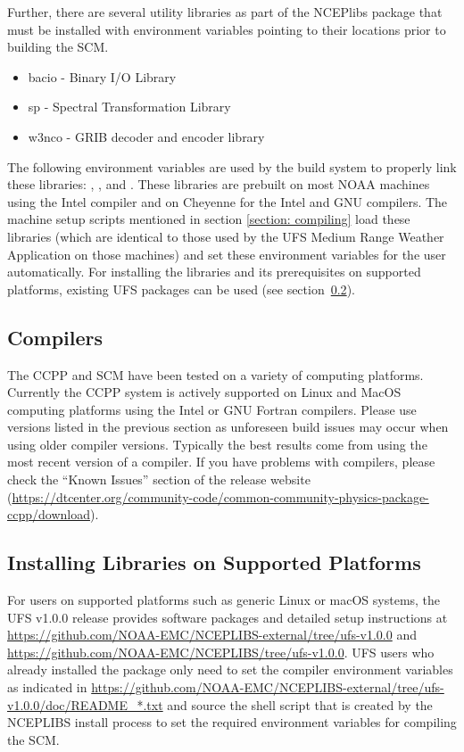 Further, there are several utility libraries as part of the NCEPlibs package that must be installed with environment variables pointing to their locations prior to building the SCM.
\begin{itemize}
    \item bacio - Binary I/O Library
    \item sp - Spectral Transformation Library
    \item w3nco - GRIB decoder and encoder library
\end{itemize}
The following environment variables are used by the build system to properly link these libraries: , , and .  These libraries are prebuilt on most NOAA machines using the Intel compiler and on Cheyenne for the Intel and GNU compilers. The machine setup scripts mentioned in section \ref{section: compiling} load these libraries (which are identical to those used by the UFS Medium Range Weather Application on those machines) and set these environment variables for the user automatically. For installing the libraries and its prerequisites on supported platforms, existing UFS packages can be used (see section~\ref{section: setup_supported_platforms}).

\subsection{Compilers}
The CCPP and SCM have been tested on a variety of
computing platforms. Currently the CCPP system is actively supported
on Linux and MacOS computing platforms using the Intel or GNU Fortran
compilers. Please use versions listed in the previous section as unforeseen
build issues may occur when using older compiler versions. Typically the best results come from using the
most recent version of a compiler. If you have problems with compilers, please check the ``Known Issues'' section of the
release website (\url{https://dtcenter.org/community-code/common-community-physics-package-ccpp/download}).

\subsection{Installing Libraries on Supported Platforms}\label{section: setup_supported_platforms}
For users on supported platforms such as generic Linux or macOS systems, the UFS v1.0.0 release provides software packages and detailed setup instructions at \url{https://github.com/NOAA-EMC/NCEPLIBS-external/tree/ufs-v1.0.0} and \url{https://github.com/NOAA-EMC/NCEPLIBS/tree/ufs-v1.0.0}. UFS users who already installed the  package only need to set the compiler environment variables as indicated in \url{https://github.com/NOAA-EMC/NCEPLIBS-external/tree/ufs-v1.0.0/doc/README_*.txt} and source the shell script that is created by the NCEPLIBS install process to set the required environment variables for compiling the SCM.

